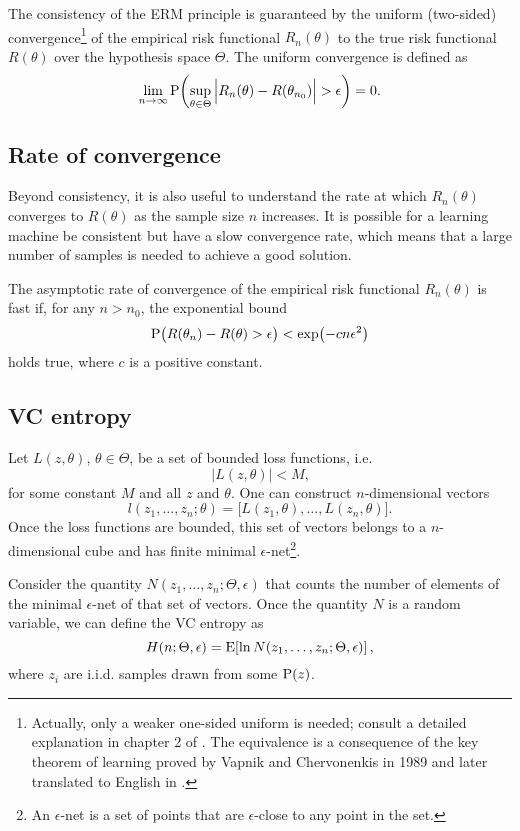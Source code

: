 The consistency of the ERM principle is guaranteed by the uniform (two-sided)
convergence\footnote{ Actually, only a weaker one-sided uniform is needed; consult a
detailed explanation in chapter 2 of .  The equivalence is a
consequence of the key theorem of learning proved by Vapnik and Chervonenkis in 1989 and
later translated to English in .} of the empirical risk functional
$R_n(\theta)$ to the true risk functional $R(\theta)$ over the hypothesis space $\Theta$.
The uniform convergence is defined as
\[
  \lim_{n \to \infty} \operatorname{P}\!\left(
    \sup_{\theta \in \Theta} \Big| R_n(\theta) - R(\theta_{n_0}) \Big| > \epsilon
  \right) = 0\text{.}
\]

\subsection{Rate of convergence}

Beyond consistency, it is also useful to understand the rate at which $R_n(\theta)$
converges to $R(\theta)$ as the sample size $n$ increases.  It is possible for a learning
machine be consistent but have a slow convergence rate, which means that a large number of
samples is needed to achieve a good solution.

The asymptotic rate of convergence of the empirical risk functional $R_n(\theta)$ is
fast if, for any $n > n_0$, the exponential bound
\[
  \operatorname{P}\!\big(R(\theta_n) - R(\theta) > \epsilon\big) < \exp\!\left( - c n \epsilon^2 \right)
\]
holds true, where $c$ is a positive constant.

\subsection{VC entropy}

Let $L(z, \theta)$, $\theta \in \Theta$, be a set of bounded loss functions, i.e.
\[
  \left| L(z, \theta) \right| < M\text{,}
\]
for some constant $M$ and all $z$ and $\theta$.  One can construct $n$-dimensional vectors
\[
  l(z_1, \dots, z_n; \theta) = \big[ L(z_1, \theta), \dots, L(z_n, \theta) \big]\text{.}
\]
Once the loss functions are bounded, this set of vectors belongs to a $n$-dimensional
cube and has finite minimal $\epsilon$-net\footnote{An $\epsilon$-net is a set of points
that are $\epsilon$-close to any point in the set.}.

Consider the quantity $N(z_1, \dots, z_n; \Theta, \epsilon)$ that counts the number of
elements of the minimal $\epsilon$-net of that set of vectors.
Once the quantity $N$ is a random variable, we can define the VC entropy as
\[
  H(n; \Theta, \epsilon) = \operatorname{E}\!\left[ \ln N(z_1, \dots, z_n; \Theta, \epsilon) \right]\text{,}
\]
where $z_i$ are i.i.d. samples drawn from some $\operatorname{P}(z)$.

